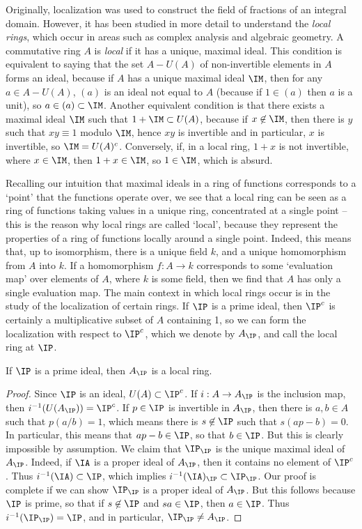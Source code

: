 Originally, localization was used to construct the field of fractions of an integral domain. However, it has been studied in more detail to understand the \emph{local rings}, which occur in areas such as complex analysis and algebraic geometry. A commutative ring $A$ is \emph{local} if it has a unique, maximal ideal. This condition is equivalent to saying that the set $A - U(A)$ of non-invertible elements in $A$ forms an ideal, because if $A$ has a unique maximal ideal $\IM$, then for any $a \in A - U(A)$, $(a)$ is an ideal not equal to $A$ (because if $1 \in (a)$ then $a$ is a unit), so $a \in (a) \subset \IM$. Another equivalent condition is that there exists a maximal ideal $\IM$ such that $1 + \IM \subset U(A)$, because if $x \not \in \IM$, then there is $y$ such that $xy \equiv 1$ modulo $\IM$, hence $xy$ is invertible and in particular, $x$ is invertible, so $\IM = U(A)^c$. Conversely, if, in a local ring, $1 + x$ is not invertible, where $x \in \IM$, then $1 + x \in \IM$, so $1 \in \IM$, which is absurd.

Recalling our intuition that maximal ideals in a ring of functions corresponds to a `point' that the functions operate over, we see that a local ring can be seen as a ring of functions taking values in a unique ring, concentrated at a single point -- this is the reason why local rings are called `local', because they represent the properties of a ring of functions locally around a single point. Indeed, this means that, up to isomorphism, there is a unique field $k$, and a unique homomorphism from $A$ into $k$. If a homomorphism $f: A \to k$ corresponds to some `evaluation map' over elements of $A$, where $k$ is some field, then we find that $A$ has only a single evaluation map. The main context in which local rings occur is in the study of the localization of certain rings. If $\IP$ is a prime ideal, then $\IP^c$ is certainly a multiplicative subset of $A$ containing 1, so we can form the localization with respect to $\IP^c$, which we denote by $A_{\IP}$, and call the local ring at $\IP$.

\begin{theorem}
    If $\IP$ is a prime ideal, then $A_{\IP}$ is a local ring.
\end{theorem}
\begin{proof}
    Since $\IP$ is an ideal, $U(A) \subset \IP^c$. If $i: A \to A_{\IP}$ is the inclusion map, then $i^{-1}(U(A_{\IP})) = \IP^c$. If $p \in \IP$ is invertible in $A_{\IP}$, then there is $a,b \in A$ such that $p(a/b) = 1$, which means there is $s \not \in \IP$ such that $s(ap - b) = 0$. In particular, this means that $ap - b \in \IP$, so that $b \in \IP$. But this is clearly impossible by assumption. We claim that $\IP_{\IP}$ is the unique maximal ideal of $A_{\IP}$. Indeed, if $\IA$ is a proper ideal of $A_{\IP}$, then it contains no element of $\IP^c$. Thus $i^{-1}(\IA) \subset \IP$, which implies $i^{-1}(\IA)_{\IP} \subset \IP_{\IP}$. Our proof is complete if we can show $\IP_{\IP}$ is a proper ideal of $A_{\IP}$. But this follows because $\IP$ is prime, so that if $s \not \in \IP$ and $sa \in \IP$, then $a \in \IP$. Thus $i^{-1}(\IP_{\IP}) = \IP$, and in particular, $\IP_{\IP} \neq A_{\IP}$.
\end{proof}

